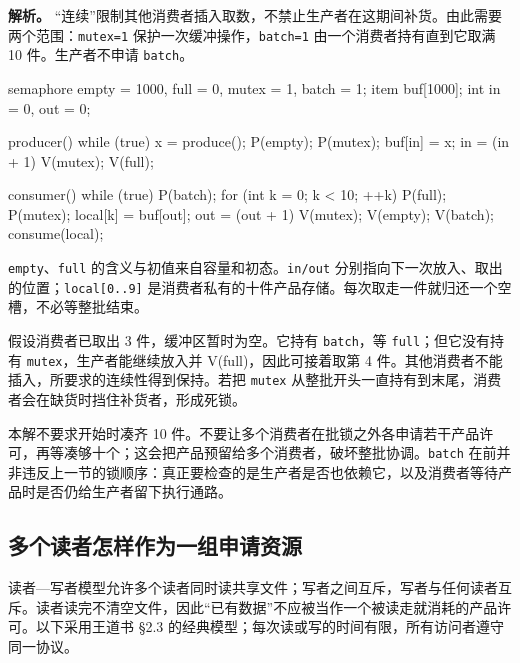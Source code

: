 \textbf{解析。} ``连续''限制其他消费者插入取数，不禁止生产者在这期间补货。由此需要两个范围：\texttt{mutex=\allowbreak{}1} 保护一次缓冲操作，\texttt{batch=\allowbreak{}1} 由一个消费者持有直到它取满 10 件。生产者不申请 \texttt{batch}。

\begin{codeblock}[language={}]
semaphore empty = 1000, full = 0, mutex = 1, batch = 1;
item buf[1000];
int in = 0, out = 0;

producer() {
    while (true) {
        x = produce();
        P(empty);
        P(mutex);
        buf[in] = x;
        in = (in + 1) %
        V(mutex);
        V(full);
    }
}
\end{codeblock}

\begin{codeblock}[language={}]
consumer() {
    while (true) {
        P(batch);
        for (int k = 0; k < 10; ++k) {
            P(full);
            P(mutex);
            local[k] = buf[out];
            out = (out + 1) %
            V(mutex);
            V(empty);
        }
        V(batch);
        consume(local);
    }
}
\end{codeblock}

\texttt{empty}、\texttt{full} 的含义与初值来自容量和初态。\texttt{in/\allowbreak{}out} 分别指向下一次放入、取出的位置；\texttt{local[0..9]} 是消费者私有的十件产品存储。每次取走一件就归还一个空槽，不必等整批结束。

假设消费者已取出 3 件，缓冲区暂时为空。它持有 \texttt{batch}，等 \texttt{full}；但它没有持有 \texttt{mutex}，生产者能继续放入并 V(full)，因此可接着取第 4 件。其他消费者不能插入，所要求的连续性得到保持。若把 \texttt{mutex} 从整批开头一直持有到末尾，消费者会在缺货时挡住补货者，形成死锁。

本解不要求开始时凑齐 10 件。不要让多个消费者在批锁之外各申请若干产品许可，再等凑够十个；这会把产品预留给多个消费者，破坏整批协调。\texttt{batch} 在前并非违反上一节的锁顺序：真正要检查的是生产者是否也依赖它，以及消费者等待产品时是否仍给生产者留下执行通路。

\subsection{多个读者怎样作为一组申请资源}\label{OS02-readers}

读者---写者模型允许多个读者同时读共享文件；写者之间互斥，写者与任何读者互斥。读者读完不清空文件，因此``已有数据''不应被当作一个被读走就消耗的产品许可。以下采用王道书 §2.3 的经典模型；每次读或写的时间有限，所有访问者遵守同一协议。


